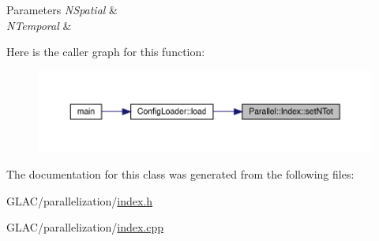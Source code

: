 \begin{DoxyParams}{Parameters}
{\em N\+Spatial} & \\
\hline
{\em N\+Temporal} & \\
\hline
\end{DoxyParams}
Here is the caller graph for this function\+:
\nopagebreak
\begin{figure}[H]
\begin{center}
\leavevmode
\includegraphics[width=350pt]{class_parallel_1_1_index_a125dc4d990ded636c91b959474c27d1f_icgraph}
\end{center}
\end{figure}


The documentation for this class was generated from the following files\+:\begin{DoxyCompactItemize}
\item 
G\+L\+A\+C/parallelization/\mbox{\hyperlink{index_8h}{index.\+h}}\item 
G\+L\+A\+C/parallelization/\mbox{\hyperlink{index_8cpp}{index.\+cpp}}\end{DoxyCompactItemize}
